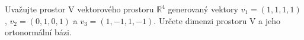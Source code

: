 Uvažujte prostor V vektorového prostoru $\mathbb{R}^{4}$ generovaný vektory
$v_{1}=(1,1,1,1)$, $v_{2}=(0,1,0,1)$ a $v_{3}=(1,-1,1,-1)$. Určete dimenzi
prostoru V a jeho ortonormální bázi.
